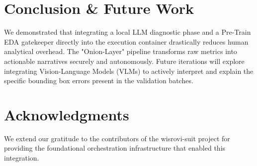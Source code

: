 \documentclass[10pt,twocolumn,letterpaper]{article}
\begin{document}
\section{Conclusion \& Future Work}
We demonstrated that integrating a local LLM diagnostic phase and a Pre-Train EDA gatekeeper directly into the execution container drastically reduces human analytical overhead. The "Onion-Layer" pipeline transforms raw metrics into actionable narratives securely and autonomously. Future iterations will explore integrating Vision-Language Models (VLMs) to actively interpret and explain the specific bounding box errors present in the validation batches.

\section{Acknowledgments}
We extend our gratitude to the contributors of the wisrovi-suit project for providing the foundational orchestration infrastructure that enabled this integration.



\end{document}
